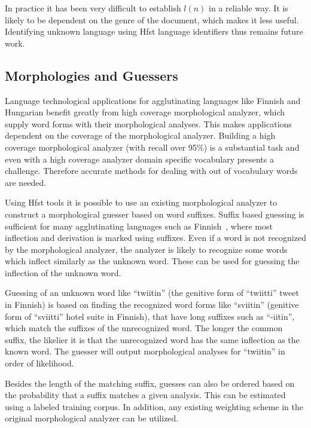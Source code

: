 \documentclass{llncs}
\begin{document}
In practice it has been very difficult to establish $l(n)$ in a
reliable way. It is likely to be dependent on the genre of the
document, which makes it less useful. Identifying unknown language
using Hfst language identifiers thus remains future work.

\subsection{Morphologies and Guessers}
\label{sec: morph-guessers}

Language technological applications for agglutinating languages like
Finnish and Hungarian benefit greatly from high coverage morphological
analyzer, which supply word forms with their morphological
analyses. This makes applications dependent on the coverage of the
morphological analyzer. Building a high coverage morphological
analyzer (with recall over 95\%) is a substantial task and even with a
high coverage analyzer domain specific vocabulary presents a
challenge. Therefore accurate methods for dealing with out of
vocabulary words are needed.

Using Hfst tools it is possible to use an existing morphological
analyzer to construct a morphological guesser based on word
suffixes. Suffix based guessing is sufficient for many agglutinating
languages such as Finnish~\cite{linden/2009/nodalida}, where most
inflection and derivation is marked using suffixes. Even if a word is
not recognized by the morphological analyzer, the analyzer is likely
to recognize some words which inflect similarly as the unknown
word. These can be used for guessing the inflection of the unknown
word.

Guessing of an unknown word like ``twiitin'' (the genitive form of
``twiitti'' tweet in Finnish) is based on finding the recognized word
forms like ``sviitin'' (genitive form of ``sviitti'' hotel suite in
Finnish), that have long suffixes such as ``-iitin'', which match the
suffixes of the unrecognized word. The longer the common suffix, the
likelier it is that the unrecognized word has the same inflection as
the known word. The guesser will output morphological analyses for
``twiitin'' in order of likelihood.

Besides the length of the matching suffix, guesses can also be ordered
based on the probability that a suffix matches a given analysis. This
can be estimated using a labeled training corpus. In addition, any
existing weighting scheme in the original morphological analyzer can
be utilized.
\end{document}
